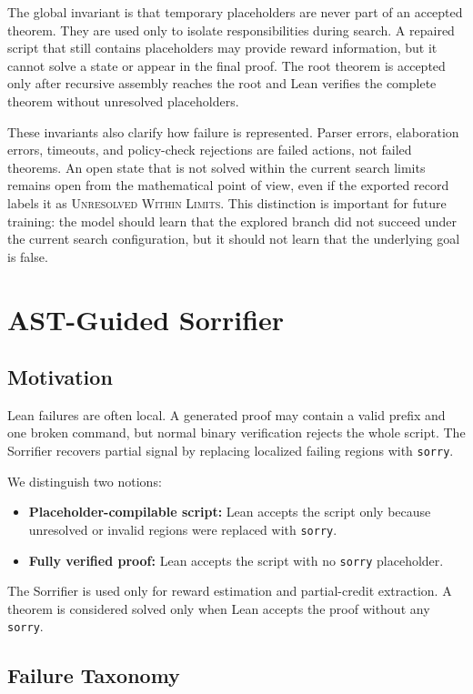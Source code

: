 \documentclass[en]{uet_awesome_thesis/uet-awesome-thesis}
\begin{document}
The global invariant is that temporary placeholders are never part of an accepted theorem. They are used only to isolate responsibilities during search. A repaired script that still contains placeholders may provide reward information, but it cannot solve a state or appear in the final proof. The root theorem is accepted only after recursive assembly reaches the root and Lean verifies the complete theorem without unresolved placeholders.

These invariants also clarify how failure is represented. Parser errors, elaboration errors, timeouts, and policy-check rejections are failed actions, not failed theorems. An open state that is not solved within the current search limits remains open from the mathematical point of view, even if the exported record labels it as \textsc{Unresolved Within Limits}. This distinction is important for future training: the model should learn that the explored branch did not succeed under the current search configuration, but it should not learn that the underlying goal is false.

\chapter{AST-Guided Sorrifier}
\label{sec:Sorrifier}

\section{Motivation}

Lean failures are often local. A generated proof may contain a valid prefix and one broken command, but normal binary verification rejects the whole script. The Sorrifier recovers partial signal by replacing localized failing regions with \texttt{sorry}.

We distinguish two notions:
\begin{itemize}
    \item \textbf{Placeholder-compilable script:} Lean accepts the script only because unresolved or invalid regions were replaced with \texttt{sorry}.
    \item \textbf{Fully verified proof:} Lean accepts the script with no \texttt{sorry} placeholder.
\end{itemize}
The Sorrifier is used only for reward estimation and partial-credit extraction. A theorem is considered solved only when Lean accepts the proof without any \texttt{sorry}.

\section{Failure Taxonomy}
\end{document}
